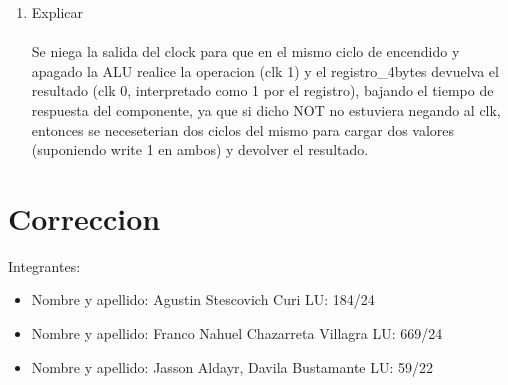 \documentclass{article}
\begin{document}
\begin{enumerate}
    \item Explicar\\\\
    Se niega la salida del clock para que en el mismo ciclo de encendido y apagado la ALU realice la operacion (clk 1) y el registro\_4bytes devuelva el resultado (clk 0, interpretado como 1 por el registro), bajando el tiempo de respuesta del componente, ya que si dicho NOT no estuviera negando al clk, entonces se neceseterian dos ciclos del mismo para cargar dos valores (suponiendo write 1 en ambos) y devolver el resultado.
\end{enumerate}

\section{\textbf{Correccion}}

Integrantes:

\begin{itemize}
    \item Nombre y apellido: Agustin Stescovich Curi LU: 184/24
    \item Nombre y apellido: Franco Nahuel Chazarreta Villagra LU: 669/24
    \item Nombre y apellido: Jasson Aldayr, Davila Bustamante LU: 59/22

\end{itemize}
\end{document}
